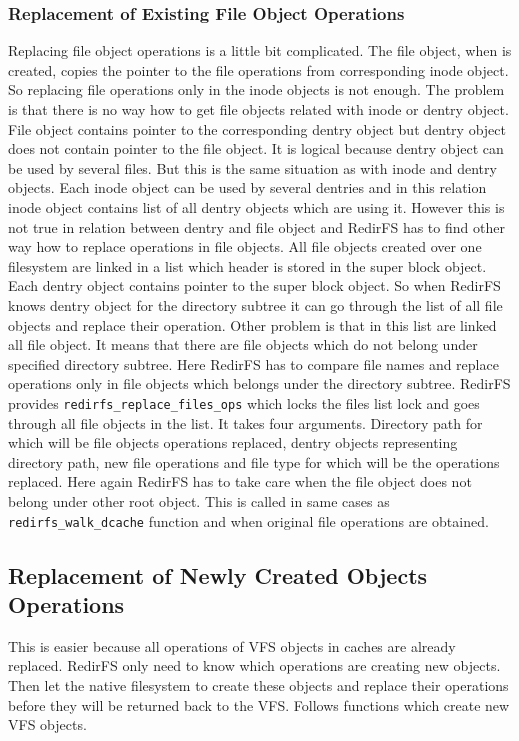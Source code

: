 \subsubsection{Replacement of Existing File Object Operations}
Replacing file object operations is a little bit complicated. The file object, when is
created, copies the pointer to the file operations from corresponding inode object. So
replacing file operations only in the inode objects is not enough. The problem is that
there is no way how to get file objects related with inode or dentry object. File
object contains pointer to the corresponding dentry object but dentry object does not
contain pointer to the file object. It is logical because dentry object can be used by
several files. But this is the same situation as with inode and dentry objects. Each
inode object can be used by several dentries and in this relation inode object
contains list of all dentry objects which are using it. However this is not true in
relation between dentry and file object and RedirFS has to find other way how to
replace operations in file objects. All file objects created over one filesystem are
linked in a list which header is stored in the super block object. Each dentry object
contains pointer to the super block object. So when RedirFS knows dentry object for
the directory subtree it can go through the list of all file objects and replace their
operation. Other problem is that in this list are linked all file object. It means
that there are file objects which do not belong under specified directory subtree.
Here RedirFS has to compare file names and replace operations only in file objects
which belongs under the directory subtree. RedirFS provides
\texttt{redirfs\_replace\_files\_ops} which locks the files list lock and goes through
all file objects in the list. It takes four arguments. Directory path for which will
be file objects operations replaced, dentry objects representing directory path, new
file operations and file type for which will be the operations replaced. Here again
RedirFS has to take care when the file object does not belong under other root object. 
This is called in same cases as \texttt{redirfs\_walk\_dcache} function and when
original file operations are obtained.

\subsection{Replacement of Newly Created Objects Operations}
This is easier because all operations of VFS objects in caches are already replaced.
RedirFS only need to know which operations are creating new objects. Then let the
native filesystem to create these objects and replace their operations before they
will be returned back to the VFS. Follows functions which create new VFS objects.

